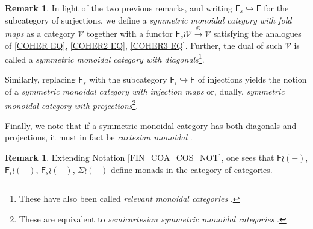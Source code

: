 \documentclass[a4paper,10pt
,draft
]{article}%
\numberwithin{equation}{section}
\numberwithin{figure}{section}
\theoremstyle{definition} %
\newtheorem{remark}[equation]{Remark}%
\newcommand{\Fin}{\mathsf{F}}%
\newcommand{\F}{\ensuremath{\mathcal F}}
\newcommand{\1}{\ensuremath{\mathbbm 1}}%
\begin{document}


\begin{remark}\label{FINSURJ REM}
	In light of the two previous remarks,
	and writing $\Fin_s \hookrightarrow \Fin$ 
	for the subcategory of surjections,
	we define a 
	\textit{symmetric monoidal category with fold maps}
	as a category $\mathcal{V}$ together with a functor
	$\Fin_s \wr \mathcal{V} \xrightarrow{\otimes} \mathcal{V}$
	satisfying the analogues of  
	\eqref{COHER EQ}, \eqref{COHER2 EQ}, \eqref{COHER3 EQ}.
	Further, the dual of such $\mathcal{V}$ is called a 
	\textit{symmetric monoidal category with diagonals}\footnote{
	These have also been called \textit{relevant monoidal categories} \cite{DP07}.}.
	
	Similarly, replacing $\Fin_s$ with the subcategory
$\Fin_i \hookrightarrow \Fin$ of injections yields the notion of a \textit{symmetric monoidal category with injection maps} or, dually, \textit{symmetric monoidal category with projections}\footnote{
These are equivalent to \textit{semicartesian symmetric monoidal categories} \cite{Lei16}.}.

Finally, we note that if a symmetric monoidal category has both diagonals and projections, it must in fact be \textit{cartesian monoidal} \cite[IV.2]{EK66}.
\end{remark}


\begin{remark}
	Extending Notation \ref{FIN_COA_COS_NOT}, one sees that 
	$\Fin \wr (\minus)$, 
	$\Fin_i \wr (\minus)$,
	$\Fin_s \wr (\minus)$,
	$\Sigma \wr (\minus)$
define monads in the category of categories.
%	
\end{remark}
\end{document}
